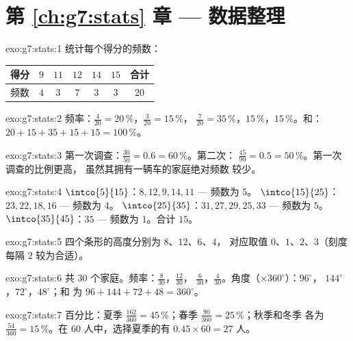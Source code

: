 \section*{第 \ref{ch:g7:stats} 章 --- 数据整理}

\begin{solution}{exo:g7:stats:1}
统计每个得分的频数：
\begin{center}
\renewcommand{\arraystretch}{1.2}
\begin{tabular}{l|ccccc|c}
得分 & $9$ & $11$ & $12$ & $14$ & $15$ & 合计 \\
\hline
频数 & $4$ & $3$ & $7$ & $3$ & $3$ & $20$ \\
\end{tabular}
\end{center}
\end{solution}

\begin{solution}{exo:g7:stats:2}
频率：$\frac{4}{20} = 20\,\%$，$\frac{3}{20} = 15\,\%$，
$\frac{7}{20} = 35\,\%$，$15\,\%$，$15\,\%$。和：
$20 + 15 + 35 + 15 + 15 = 100\,\%$。\checkmark
\end{solution}

\begin{solution}{exo:g7:stats:3}
第一次调查：$\frac{30}{50} = 0.6 = 60\,\%$。第二次：
$\frac{45}{90} = 0.5 = 50\,\%$。第一次调查的比例更高，
虽然其拥有一辆车的家庭绝对频数
较少。
\end{solution}

\begin{solution}{exo:g7:stats:4}
$\intco{5}{15}$：$8, 12, 9, 14, 11$ --- 频数为 $5$。
$\intco{15}{25}$：$23, 22, 18, 16$ --- 频数为 $4$。
$\intco{25}{35}$：$31, 27, 29, 25, 33$ --- 频数为 $5$。
$\intco{35}{45}$：$35$ --- 频数为 $1$。合计 $15$。\checkmark
\end{solution}

\begin{solution}{exo:g7:stats:5}
四个条形的高度分别为 $8$、$12$、$6$、$4$，
对应取值 $0$、$1$、$2$、$3$（刻度每隔 $2$ 较为合适）。
\end{solution}

\begin{solution}{exo:g7:stats:6}
共 $30$ 个家庭。频率：$\frac{8}{30}$，$\frac{12}{30}$，
$\frac{6}{30}$，$\frac{4}{30}$。角度（$\times 360^\circ$）：$96^\circ$，
$144^\circ$，$72^\circ$，$48^\circ$；和
为 $96 + 144 + 72 + 48 = 360^\circ$。\checkmark
\end{solution}

\begin{solution}{exo:g7:stats:7}
百分比：夏季 $\frac{162}{360} = 45\,\%$；春季
$\frac{90}{360} = 25\,\%$；秋季和冬季
各为 $\frac{54}{360} = 15\,\%$。在 $60$ 人中，选择夏季的有
$0.45 \times 60 = 27$ 人。
\end{solution}

